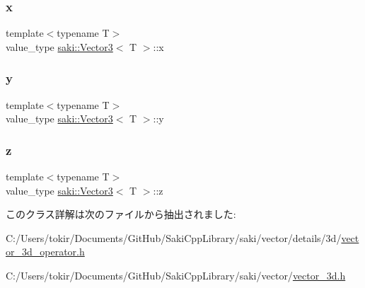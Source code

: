 \subsubsection{\texorpdfstring{x}{x}}
{\footnotesize\ttfamily template$<$typename T$>$ \\
value\+\_\+type \mbox{\hyperlink{classsaki_1_1_vector3}{saki\+::\+Vector3}}$<$ T $>$\+::x}

\mbox{\label{classsaki_1_1_vector3_add21d7ee62c5dbc05fda72ae06633a1b}} 
\subsubsection{\texorpdfstring{y}{y}}
{\footnotesize\ttfamily template$<$typename T$>$ \\
value\+\_\+type \mbox{\hyperlink{classsaki_1_1_vector3}{saki\+::\+Vector3}}$<$ T $>$\+::y}

\mbox{\label{classsaki_1_1_vector3_a367fbb31983a92e64852970edf9a315e}} 
\subsubsection{\texorpdfstring{z}{z}}
{\footnotesize\ttfamily template$<$typename T$>$ \\
value\+\_\+type \mbox{\hyperlink{classsaki_1_1_vector3}{saki\+::\+Vector3}}$<$ T $>$\+::z}



このクラス詳解は次のファイルから抽出されました\+:\begin{DoxyCompactItemize}
\item 
C\+:/\+Users/tokir/\+Documents/\+Git\+Hub/\+Saki\+Cpp\+Library/saki/vector/details/3d/\mbox{\hyperlink{vector__3d__operator_8h}{vector\+\_\+3d\+\_\+operator.\+h}}\item 
C\+:/\+Users/tokir/\+Documents/\+Git\+Hub/\+Saki\+Cpp\+Library/saki/vector/\mbox{\hyperlink{vector__3d_8h}{vector\+\_\+3d.\+h}}\end{DoxyCompactItemize}
